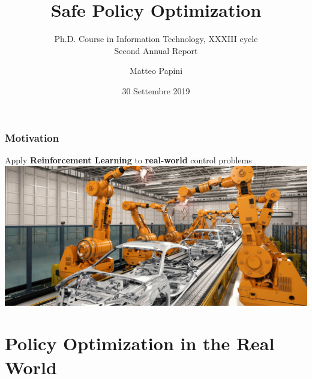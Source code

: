 \documentclass{beamer}
\title[Safe Policy Optimization]{Safe Policy Optimization}
\subtitle{{\small Ph.D. Course in Information Technology, XXXIII cycle} \\Second Annual Report}
\author[M. Papini]{Matteo Papini}
\date[30/9/2019]{\small 30 Settembre 2019}
\begin{document}
\begin{frame}
\titlepage
\end{frame}

\addtocounter{framenumber}{-1}

\begin{frame}
\frametitle{Motivation}
Apply \textbf{Reinforcement Learning} to \textbf{real-world} control problems
\vfill
\includegraphics[width=\textwidth]{pics/factory.jpg}
\end{frame}

\addtocounter{framenumber}{-1}
\begin{frame}[plain]
\tableofcontents
\end{frame}

\section{Policy Optimization in the Real World}
\end{document}
